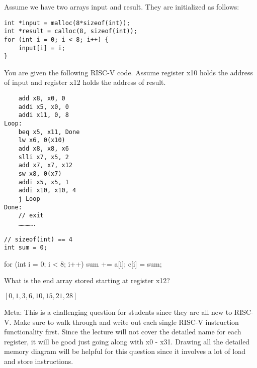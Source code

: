 \begin{blocksection}
\question Assume we have two arrays input and result. They are initialized as follows:

\begin{verbatim}
int *input = malloc(8*sizeof(int));
int *result = calloc(8, sizeof(int));
for (int i = 0; i < 8; i++) {
    input[i] = i;
}
\end{verbatim}

You are given the following RISC-V code. Assume register x10 holds the address of input and register x12 holds the address of result.

\begin{verbatim}
    add x8, x0, 0
    addi x5, x0, 0
    addi x11, 0, 8
Loop:
    beq x5, x11, Done
    lw x6, 0(x10)
    add x8, x8, x6
    slli x7, x5, 2
    add x7, x7, x12
    sw x8, 0(x7)
    addi x5, x5, 1
    addi x10, x10, 4
    j Loop
Done:
    // exit
    ………….
\end{verbatim}

\begin{verbatim}
// sizeof(int) == 4
int sum = 0;
\end{verbatim}
\begin{solution}[0.7in]
for (int i = 0; i < 8; i++) {
    sum += a[i];
    c[i] = sum;
}
\end{solution}

\question What is the end array stored starting at register x12?

\begin{solution}
$[0, 1, 3, 6, 10, 15, 21, 28]$

Meta: This is a challenging question for students since they are all new to RISC-V. Make sure to walk through and write out each single RISC-V instruction functionality first. Since the lecture will not cover the detailed name for each register, it will be good just going along with x0 - x31. Drawing all the detailed memory diagram will be helpful for this question since it involves a lot of load and store instructions. 
\end{solution}
\end{blocksection}